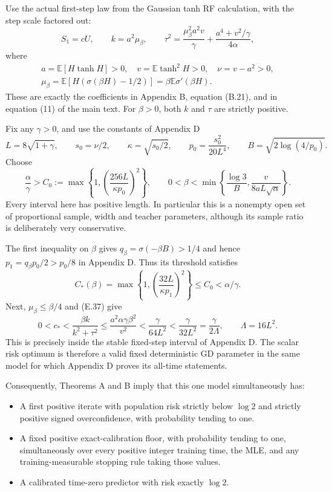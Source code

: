 \documentclass[
  11pt,
  a4paper,
]{article}
\providecommand{\tightlist}{%
  \setlength{\itemsep}{0pt}\setlength{\parskip}{0pt}}
\begin{document}
Use the actual first-step law from the Gaussian tanh RF calculation,
with the step scale factored out: \[
S_1=cU,\qquad
k=a^2\mu_\beta,\qquad
\tau^2=\frac{\mu_\beta^2a^2v}{\gamma}
+\frac{a^4+v^2/\gamma}{4\alpha},
\tag{E.37}
\] where \[
\begin{gathered}
a=\mathbb E[H\tanh H]>0,\quad v=\mathbb E\tanh^2H>0,\quad \nu=v-a^2>0,\\
\mu_\beta=\mathbb E[H(\sigma(\beta H)-1/2)]=\beta\mathbb E\sigma'(\beta H).
\end{gathered}
\] These are exactly the coefficients in Appendix B, equation (B.21),
and in equation (11) of the main text. For \(\beta>0\), both \(k\) and
\(\tau\) are strictly positive.

Fix any \(\gamma>0\), and use the constants of Appendix D \[
L=8\sqrt{1+\gamma},\qquad
s_0=\nu/2,\qquad
\kappa=\sqrt{s_0/2},\qquad
p_0=\frac{s_0^2}{20L^4},\qquad
B=\sqrt{2\log(4/p_0)}.
\] Choose \[
\frac{\alpha}{\gamma}>
C_0:=\max\left\{1,\left(\frac{256L}{\kappa p_0}\right)^2\right\},
\qquad
0<\beta<
\min\left\{\frac{\log3}{B},\frac{v}{8aL\sqrt\alpha}\right\}.
\tag{E.38}
\] Every interval here has positive length. In particular this is a
nonempty open set of proportional sample, width and teacher parameters,
although its sample ratio is deliberately very conservative.

The first inequality on \(\beta\) gives \(q_\beta=\sigma(-\beta B)>1/4\)
and hence \(p_1=q_\beta p_0/2>p_0/8\) in Appendix D. Thus its threshold
satisfies \[
C_*(\beta)=
\max\left\{1,\left(\frac{32L}{\kappa p_1}\right)^2\right\}
\le C_0<\alpha/\gamma.
\tag{E.39}
\] Next, \(\mu_\beta\le\beta/4\) and (E.37) give \[
0<c_*<\frac{\beta k}{k^2+\tau^2}
\le\frac{a^2\alpha\gamma\beta^2}{v^2}
<\frac{\gamma}{64L^2}
<\frac{\gamma}{32L^2}
=\frac{\gamma}{2\Lambda},
\qquad\Lambda=16L^2.
\tag{E.40}
\] This is precisely inside the stable fixed-step interval of Appendix
D. The scalar risk optimum is therefore a valid fixed deterministic GD
parameter in the same model for which Appendix D proves its all-time
statements.

Consequently, Theorems A and B imply that this one model simultaneously
has:

\begin{itemize}
\tightlist
\item
  A first positive iterate with population risk strictly below \(\log2\)
  and strictly positive signed overconfidence, with probability tending
  to one.
\item
  A fixed positive exact-calibration floor, with probability tending to
  one, simultaneously over every positive integer training time, the
  MLE, and any training-measurable stopping rule taking those values.
\item
  A calibrated time-zero predictor with risk exactly \(\log2\).
\end{itemize}
\end{document}
